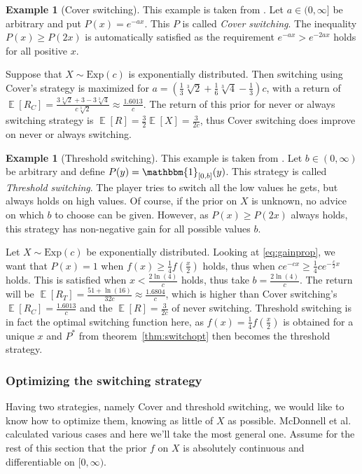 \documentclass[twoside,a4paper]{article}
\theoremstyle{plain}
\theoremstyle{definition}
\newtheorem{example}[theorem]{Example}
\theoremstyle{remark}
\numberwithin{equation}{section}
\DeclareMathOperator{\E}{\mathbb{E}}
\DeclareMathOperator{\1}{\mathbbm{1}}
\begin{document}
\begin{example}[Cover switching]
This example is taken from \cite{McDonnell09,Abbott10}. Let $a\in(0,\infty]$ be arbitrary and put $P(x)=e^{-ax}$. This $P$ is called \emph{Cover switching}. The inequality $P(x)\geq P(2x)$ is automatically satisfied as the requirement $e^{-ax}>e^{-2ax}$ holds for all positive $x$.

Suppose that $X\sim\mathrm{Exp}(c)$ is exponentially distributed. Then switching using Cover's strategy is maximized for $a=\left(\frac{1}{3}\sqrt[3]{2}+\frac{1}{6}\sqrt[3]{4}-\frac{1}{3}\right)c$, with a return of $\E[R_C]=\frac{3\sqrt[3]{2}+3-3\sqrt[3]{4}}{c\sqrt[3]{2}}\approx\frac{1.6013}{c}$. The return of this prior for never or always switching strategy is $\E[R]=\frac{3}{2}\E[X]=\frac{3}{2c}$, thus Cover switching does improve on never or always switching.
\end{example}

\begin{example}[Threshold switching]
This example is taken from \cite{McDonnell09}. Let $b\in(0,\infty)$ be arbitrary and define $P(y)=\1_{[0,b]}(y)$. This strategy is called \emph{Threshold switching}. The player tries to switch all the low values he gets, but always holds on high values. Of course, if the prior on $X$ is unknown, no advice on which $b$ to choose can be given. However, as $P(x)\geq P(2x)$ always holds, this strategy has non-negative gain for all possible values $b$.

Let $X\sim\text{Exp}(c)$ be exponentially distributed. Looking at \eqref{eq:gainprop}, we want that $P(x)=1$ when $f(x)\geq\frac{1}{4}f\left(\frac{x}{2}\right)$ holds, thus when $ce^{-cx}\geq\frac{1}{4}ce^{-\frac{c}{2}x}$ holds. This is satisfied when $x<\frac{2\ln(4)}{c}$ holds, thus take $b=\frac{2\ln(4)}{c}$. The return will be $\E[R_T]=\frac{51+\ln(16)}{32c}\approx\frac{1.6804}{c}$, which is higher than Cover switching's $\E[R_C]=\frac{1.6013}{c}$ and the $\E[R]=\frac{3}{2c}$ of never switching. Threshold switching is in fact the optimal switching function here, as $f(x)=\frac{1}{4}f\left(\frac{x}{2}\right)$ is obtained for a unique $x$ and $P^*$ from theorem~\ref{thm:switchopt} then becomes the threshold strategy.
\end{example}

\subsubsection{Optimizing the switching strategy}
Having two strategies, namely Cover and threshold switching, we would like to know how to optimize them, knowing as little of $X$ as possible. McDonnell et al.~\cite{McDonnell11} calculated various cases and here we'll take the most general one. Assume for the rest of this section that the prior $f$ on $X$ is absolutely continuous and differentiable on $[0,\infty)$.
\end{document}
